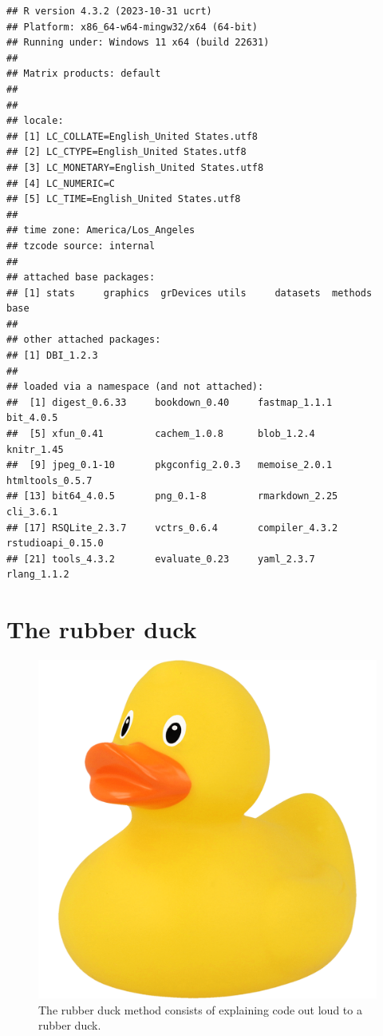 \documentclass[
]{book}
\begin{document}
\begin{verbatim}
## R version 4.3.2 (2023-10-31 ucrt)
## Platform: x86_64-w64-mingw32/x64 (64-bit)
## Running under: Windows 11 x64 (build 22631)
## 
## Matrix products: default
## 
## 
## locale:
## [1] LC_COLLATE=English_United States.utf8 
## [2] LC_CTYPE=English_United States.utf8   
## [3] LC_MONETARY=English_United States.utf8
## [4] LC_NUMERIC=C                          
## [5] LC_TIME=English_United States.utf8    
## 
## time zone: America/Los_Angeles
## tzcode source: internal
## 
## attached base packages:
## [1] stats     graphics  grDevices utils     datasets  methods   base     
## 
## other attached packages:
## [1] DBI_1.2.3
## 
## loaded via a namespace (and not attached):
##  [1] digest_0.6.33     bookdown_0.40     fastmap_1.1.1     bit_4.0.5        
##  [5] xfun_0.41         cachem_1.0.8      blob_1.2.4        knitr_1.45       
##  [9] jpeg_0.1-10       pkgconfig_2.0.3   memoise_2.0.1     htmltools_0.5.7  
## [13] bit64_4.0.5       png_0.1-8         rmarkdown_2.25    cli_3.6.1        
## [17] RSQLite_2.3.7     vctrs_0.6.4       compiler_4.3.2    rstudioapi_0.15.0
## [21] tools_4.3.2       evaluate_0.23     yaml_2.3.7        rlang_1.1.2
\end{verbatim}

\hypertarget{the-rubber-duck}{%
\section{The rubber duck}\label{the-rubber-duck}}

\begin{figure}

{\centering \includegraphics[width=0.5\linewidth]{img/rubber-duck} 

}

\caption{The rubber duck method consists of explaining code out loud to a rubber duck.}\label{fig:rubber-duck}
\end{figure}
\end{document}
